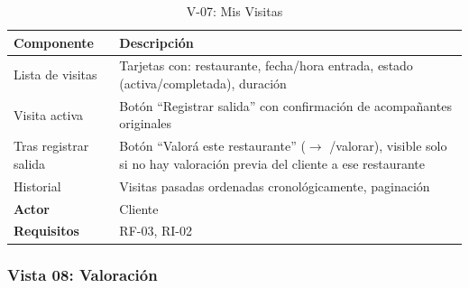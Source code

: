 \begin{table}[H]
    \centering
    \caption{V-07: Mis Visitas}
    \label{tab:vista07}
    \begin{tabular}{|>{\raggedright\arraybackslash}p{}|>{\raggedright\arraybackslash}p{}|}
        \hline
        \textbf{Componente} & \textbf{Descripción} \\
        \hline
        Lista de visitas & Tarjetas con: restaurante, fecha/hora entrada, estado (activa/completada), duración \\
        \hline
        Visita activa & Botón ``Registrar salida'' con confirmación de acompañantes originales \\
        \hline
        Tras registrar salida & Botón ``Valorá este restaurante'' (\(\rightarrow\) /valorar), visible solo si no hay valoración previa del cliente a ese restaurante \\
        \hline
        Historial & Visitas pasadas ordenadas cronológicamente, paginación \\
        \hline
        \textbf{Actor} & Cliente \\
        \hline
        \textbf{Requisitos} & RF-03, RI-02 \\
        \hline
    \end{tabular}
\end{table}

\subsubsection{Vista 08: Valoración}

